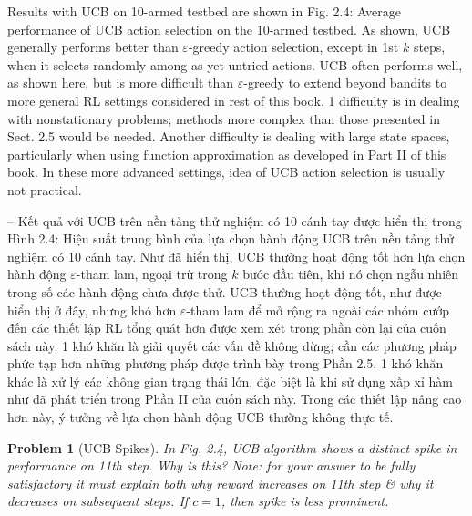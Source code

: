 \documentclass{article}
\newtheorem{problem}{Problem}
\begin{document}
\begin{itemize}
\begin{itemize}
        Results with UCB on 10-armed testbed are shown in {\sf Fig. 2.4: Average performance of UCB action selection on the 10-armed testbed. As shown, UCB generally performs better than $\varepsilon$-greedy action selection, except in 1st $k$ steps, when it selects randomly among as-yet-untried actions.} UCB often performs well, as shown here, but is more difficult than $\varepsilon$-greedy to extend beyond bandits to more general RL settings considered in rest of this book. 1 difficulty is in dealing with nonstationary problems; methods more complex than those presented in Sect. 2.5 would be needed. Another difficulty is dealing with large state spaces, particularly when using function approximation as developed in Part II of this book. In these more advanced settings, idea of UCB action selection is usually not practical.

        -- Kết quả với UCB trên nền tảng thử nghiệm có 10 cánh tay được hiển thị trong {\sf Hình 2.4: Hiệu suất trung bình của lựa chọn hành động UCB trên nền tảng thử nghiệm có 10 cánh tay. Như đã hiển thị, UCB thường hoạt động tốt hơn lựa chọn hành động $\varepsilon$-tham lam, ngoại trừ trong $k$ bước đầu tiên, khi nó chọn ngẫu nhiên trong số các hành động chưa được thử.} UCB thường hoạt động tốt, như được hiển thị ở đây, nhưng khó hơn $\varepsilon$-tham lam để mở rộng ra ngoài các nhóm cướp đến các thiết lập RL tổng quát hơn được xem xét trong phần còn lại của cuốn sách này. 1 khó khăn là giải quyết các vấn đề không dừng; cần các phương pháp phức tạp hơn những phương pháp được trình bày trong Phần 2.5. 1 khó khăn khác là xử lý các không gian trạng thái lớn, đặc biệt là khi sử dụng xấp xỉ hàm như đã phát triển trong Phần II của cuốn sách này. Trong các thiết lập nâng cao hơn này, ý tưởng về lựa chọn hành động UCB thường không thực tế.

        \begin{problem}[UCB Spikes]
            In Fig. 2.4, UCB algorithm shows a distinct spike in performance on 11th step. Why is this? Note: for your answer to be fully satisfactory it must explain both why reward increases on 11th step \& why it decreases on subsequent steps. If $c = 1$, then spike is less prominent.


\end{problem}
\end{itemize}
\end{itemize}
\end{document}
